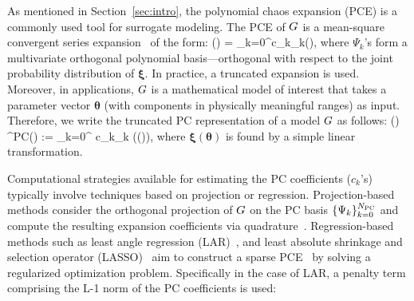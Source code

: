 

As mentioned in Section~\ref{sec:intro}, the 
polynomial chaos expansion
(PCE) is a commonly used tool for surrogate modeling. 
The PCE of
$G$ is a mean-square 
convergent series expansion~\cite{Xiu:2002,Ghanem:2003,Olivier:2010} of the form:
\be
\GG(\bm\xi) = \sum_{k=0}^\infty c_k\Psi_k(\bm{\xi}),
\ee
where $\Psi_k$'s form a multivariate orthogonal polynomial
basis---orthogonal with respect to the joint probability distribution of $\bm{\xi}$.
%
In practice, a truncated expansion is used.  Moreover, in applications, $G$
is a mathematical model of interest that takes a parameter vector $\bm{\theta}$
(with components in physically meaningful ranges) as input. Therefore, we 
write the truncated PC representation of a model $G$ as follows:
\be 
\GG(\bm\theta) \approx \GG^{\mbox{\tiny PC}}(\bm\theta) := \sum_{k=0}^{\Npc}
c_k\Psi_k (\bm\xi(\bm\theta)), 
\ee
where $\bm\xi(\bm\theta)$ is found by a simple linear transformation.

Computational strategies available for estimating the PC coefficients
($c_k$'s) typically involve techniques based on projection or regression.
Projection-based methods consider the orthogonal projection of 
$G$ on the PC basis $\{\Psi_k\}_{k=0}^{N_\text{PC}}$ and compute
the resulting expansion coefficients via quadrature~\cite{Olivier:2010}.
Regression-based methods such as least angle regression (LAR)~\cite{Efron:2004}, and least absolute shrinkage
and selection operator (LASSO)~\cite{Tibshirani:1996} aim to construct a sparse PCE~\cite{Blatman:2008}
by solving a regularized optimization problem. Specifically in the case of LAR, a penalty term comprising the L-1
norm of the PC coefficients is used:

